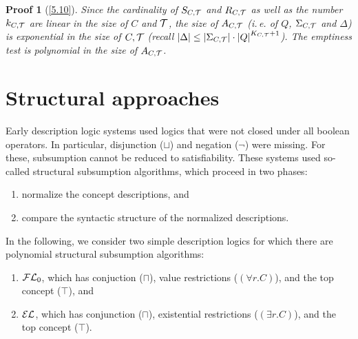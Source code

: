 \documentclass[openany]{scrbook}
\theoremstyle{break}
\theoremstyle{nonumberbreak}
\theoremstyle{nonumberplain}
\theoremstyle{nonumberbreak}
\newtheorem{Proof}{Proof}
\newcommand{\then}{\Longrightarrow}
\newcommand{\abs}[2][]{\left|{#2}\right|\ifx#1\then\else_{#1}\fi}
\newcommand{\ie}{i{.}\,e{.}\xspace}
\newcommand{\FLz}{{\cal F}{\cal L}_0}
\newcommand{\EL}{{\cal E}{\cal L}}
\begin{document}
\begin{Proof}[\cref{5.10}]
  Since the cardinality of $S_{C, {\cal T}}$ and $R_{C, {\cal T}}$ as
  well as the number $k_{C, {\cal T}}$ are linear in the size of $C$
  and ${\cal T}$, the size of $A_{C, {\cal T}}$ (\ie of $Q$,
  $\Sigma_{C, {\cal T}}$ and $\Delta$) is exponential in the size of
  $C, {\cal T}$ (recall $\abs{\Delta} \leq \abs{\Sigma_{C, {\cal T}}}
    \cdot \abs{Q}^{K_{C, {\cal T}} + 1}$). The emptiness test is
    polynomial in the size of $A_{C, {\cal T}}$.
\end{Proof}

\section{Structural approaches}
Early description logic systems used logics that were not closed under
all boolean operators. In particular, disjunction ($\sqcup$) and
negation ($\neg$) were missing. For these, subsumption cannot be
reduced to satisfiability. These systems used so-called structural
subsumption algorithms, which proceed in two phases:
\begin{enumerate}
\item normalize the concept descriptions, and
\item compare the syntactic structure of the normalized descriptions.
\end{enumerate}

In the following, we consider two simple description logics for which
there are polynomial structural subsumption algorithms:
\begin{enumerate}
\item $\FLz$, which has conjuction ($\sqcap$), value restrictions
  ($(\forall r.C)$), and the top concept ($\top$), and
\item $\EL$, which has conjunction ($\sqcap$), existential
  restrictions ($(\exists r.C)$), and the top concept ($\top$).
\end{enumerate}
\end{document}
